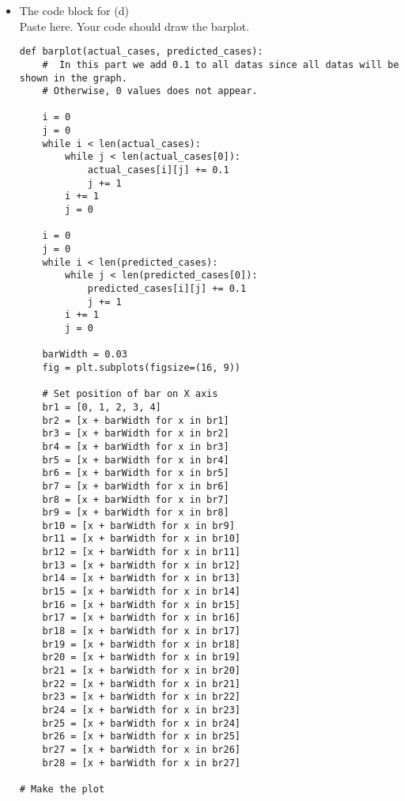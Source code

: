 \documentclass[a4 paper]{article}
\numberwithin{equation}{section}
\newcommand{\0}{\mathbf{0}}
\begin{document}
\begin{itemize}
		\item The code block for (d)\\
		Paste here. Your code should draw the barplot.
		\begin{lstlisting}
def barplot(actual_cases, predicted_cases):
    #  In this part we add 0.1 to all datas since all datas will be shown in the graph. 
    # Otherwise, 0 values does not appear.
    
    i = 0
    j = 0
    while i < len(actual_cases):
        while j < len(actual_cases[0]):
            actual_cases[i][j] += 0.1
            j += 1
        i += 1
        j = 0

    i = 0
    j = 0
    while i < len(predicted_cases):
        while j < len(predicted_cases[0]):
            predicted_cases[i][j] += 0.1
            j += 1
        i += 1
        j = 0

    barWidth = 0.03
    fig = plt.subplots(figsize=(16, 9))

    # Set position of bar on X axis
    br1 = [0, 1, 2, 3, 4]
    br2 = [x + barWidth for x in br1]
    br3 = [x + barWidth for x in br2]
    br4 = [x + barWidth for x in br3]
    br5 = [x + barWidth for x in br4]
    br6 = [x + barWidth for x in br5]
    br7 = [x + barWidth for x in br6]
    br8 = [x + barWidth for x in br7]
    br9 = [x + barWidth for x in br8]
    br10 = [x + barWidth for x in br9]
    br11 = [x + barWidth for x in br10]
    br12 = [x + barWidth for x in br11]
    br13 = [x + barWidth for x in br12]
    br14 = [x + barWidth for x in br13]
    br15 = [x + barWidth for x in br14]
    br16 = [x + barWidth for x in br15]
    br17 = [x + barWidth for x in br16]
    br18 = [x + barWidth for x in br17]
    br19 = [x + barWidth for x in br18]
    br20 = [x + barWidth for x in br19]
    br21 = [x + barWidth for x in br20]
    br22 = [x + barWidth for x in br21]
    br23 = [x + barWidth for x in br22]
    br24 = [x + barWidth for x in br23]
    br25 = [x + barWidth for x in br24]
    br26 = [x + barWidth for x in br25]
    br27 = [x + barWidth for x in br26]
    br28 = [x + barWidth for x in br27]

# Make the plot


\end{lstlisting}
\end{itemize}
\end{document}
